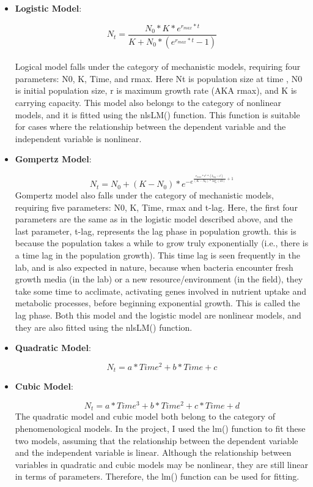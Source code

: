 \documentclass[11pt]{article}
\begin{document}
\begin{itemize}
    \item \textbf{Logistic Model}:\par
    \begin{equation*}
    N_{t} = \frac{ N_{0}*K*e^{r_{max}*t}}{K + N_{0}*(e^{r_{max}*t}-1)}
    \end{equation*} \\
    Logical model falls under the category of mechanistic models, requiring four parameters: N0, K, Time, and rmax. Here Nt is population size at time , N0 is initial population size, r is maximum growth rate (AKA rmax), and K is carrying capacity. This model also belongs to the category of nonlinear models, and it is fitted using the nlsLM() function. This function is suitable for cases where the relationship between the dependent variable and the independent variable is nonlinear.
    
    \item \textbf{Gompertz Model}:\par 
    \begin{equation*}
    N_{t} = N_{0}+(K-N_{0})*e^{-e^{\frac{r_{max}*e^{1}*(t_{lag}-t)}{(K-N_{0})*\log(10)}+1}}
    \end{equation*}
    Gompertz model also falls under the category of mechanistic models, requiring five parameters: N0, K, Time, rmax and t-lag. Here, the first four parameters are the same as in the logistic model described above, and the last parameter, t-lag, represents the lag phase in population growth. this is because the population takes a while to grow truly exponentially (i.e., there is a time lag in the population growth). This time lag is seen frequently in the lab, and is also expected in nature, because when bacteria encounter fresh growth media (in the lab) or a new resource/environment (in the field), they take some time to acclimate, activating genes involved in nutrient uptake and metabolic processes, before beginning exponential growth. This is called the lag phase. Both this model and the logistic model are nonlinear models, and they are also fitted using the nlsLM() function.

    \item \textbf{Quadratic Model}:\par 
    \begin{equation*}
    N_{t} = a*Time^{2}+b*Time+c
    \end{equation*}
    
    \item \textbf{Cubic Model}:\par
    \begin{equation*}
    N_{t} = a*Time^{3}+b*Time^{2}+c*Time+d
    \end{equation*}
    The quadratic model and cubic model both belong to the category of phenomenological models. In the project, I used the lm() function to fit these two models, assuming that the relationship between the dependent variable and the independent variable is linear. Although the relationship between variables in quadratic and cubic models may be nonlinear, they are still linear in terms of parameters. Therefore, the lm() function can be used for fitting.
\end{itemize}
\end{document}

